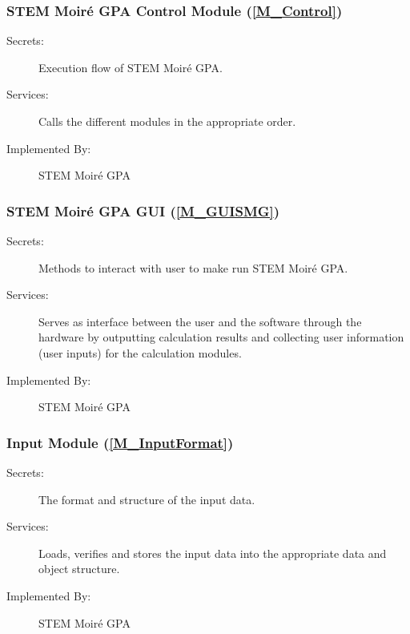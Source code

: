 \documentclass[12pt, titlepage]{article}
\newcommand{\progname}{STEM Moir{\'e} GPA}
\begin{document}

\subsubsection{\progname{} Control Module (\texorpdfstring{\cref{M_Control}}))}
\label{MG_Control}
\begin{description}
\item[Secrets:] Execution flow of \progname{}.
\item[Services:] Calls the different modules in the appropriate order.
\item[Implemented By:] \progname{}
\end{description}

\subsubsection{\progname{} GUI (\texorpdfstring{\cref{M_GUISMG}}))}
\label{MG_GUISMG}
\begin{description}
\item[Secrets:] Methods to interact with user to make run \progname{}.
\item[Services:] Serves as interface between the user and the software through 
the hardware by outputting calculation results and collecting user information 
(user inputs) for the calculation modules. 
\item[Implemented By:] \progname{}
\end{description}

\subsubsection{Input Module (\texorpdfstring{\cref{M_InputFormat}}))}
\label{MG_InputFormat}
\begin{description}
\item[Secrets:] The format and structure of the input data.
\item[Services:] Loads, verifies and stores the input data into the appropriate 
data and object structure.
\item[Implemented By:] \progname{}
\end{description}
\end{document}
